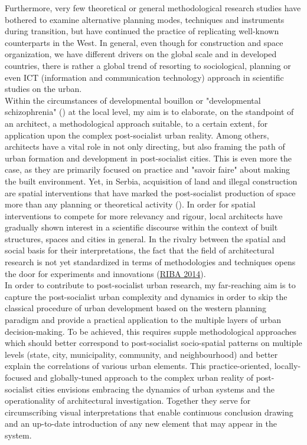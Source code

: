 \documentclass[11pt]{report}
\begin{document}
Furthermore, very few theoretical or general methodological research studies have bothered to examine alternative planning modes, techniques and instruments during transition, but have continued the practice of replicating  well-known counterparts in the West.
In general, even though for construction and space organization, we have different drivers on the global scale and in developed countries, there is rather a global trend of resorting to sociological, planning or even ICT (information and communication technology) approach in scientific studies on the urban. 
\\

Within the circumstances of developmental bouillon or "developmental schizophrenia" (\href{Vujosevic}{\citealt{vujosevic_postsocijalisticka_2010}}) at the local level, my aim is to elaborate, on the standpoint of an architect, a methodological approach suitable, to a certain extent, for application upon the complex post-socialist urban reality.
Among others, architects have a vital role in not only directing, but also framing the path of urban formation and development in post-socialist cities.
This is even more the case, as they are primarily focused on practice and "savoir faire" about making the built environment.
Yet, in Serbia, acquisition of land and illegal construction are spatial interventions that have marked the post-socialist production of space more than any planning or theoretical activity (\href{grubovic}{\citealt{grubovic_belgrade_2006}}).
In order for spatial interventions to compete for more relevancy and rigour, local architects have gradually shown interest in a scientific discourse within the context of built structures, spaces and cities in general. In the rivalry between the spatial and social basis for their interpretations, the fact that the field of architectural research is not yet standardized in terms of methodologies and techniques opens the door for experiments and innovations (\href{till}{RIBA 2014}).
\\
 
In order to contribute to post-socialist urban research, my far-reaching aim is to capture the post-socialist urban complexity and dynamics in order to skip the classical procedure of urban development based on the western planning paradigm and provide a practical application to the multiple layers of urban decision-making. To be achieved, this requires supple methodological approaches which should better correspond to post-socialist socio-spatial patterns on multiple levels (state, city, municipality, community, and neighbourhood) and better explain the correlations of various urban elements. This practice-oriented, locally-focused and globally-tuned approach to the complex urban reality of post-socialist cities envisions embracing the dynamics of urban systems and the operationality of architectural investigation.
Together they serve for circumscribing visual interpretations that enable continuous conclusion drawing and an up-to-date introduction of any new element that may appear in the system.
\\
\end{document}
